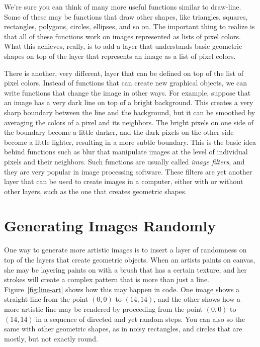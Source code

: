 We're sure you can think of many more useful functions similar to 
\textsf{draw-line}. Some of these may be functions that draw
other shapes, like triangles, squares, rectangles, polygons, circles, 
ellipses, and so on. The important thing to realize is that all of
these functions work on images represented as lists of pixel colors. 
What this achieves, really, is to add a layer that understands
basic geometric shapes on top of the layer that represents an image 
as a list of pixel colors.

There is another, very different, layer that can be defined
on top of the list of pixel colors. Instead of functions that can
create new graphical objects, we can write functions that change the
image in other ways. For example, suppose that an image has a
very dark line on top of a bright background. This creates a very 
sharp boundary between the line and the background, but it can be
smoothed by averaging the colors of a pixel and its neighbors. The
bright pixels on one side of the boundary become a little darker,
and the dark pixels on the other side become a little lighter, 
resulting in a more subtle boundary. This is the basic idea behind
functions such as \textsf{blur} that manipulate images at the level
of individual pixels and their neighbors. Such functions are usually
called \emph{image filters}, and they are very popular in image
processing software. These filters are yet another layer that can be 
used to create images in a computer, either with or without other
layers, such as the one that creates geometric shapes.

\section{Generating Images Randomly}

One way to generate more artistic images is to insert a layer of
randomness on top of the layers that create geometric objects. 
When an artists paints on canvas, she may be layering paints on
with a brush that has a certain texture, and her strokes will create
a complex pattern that is more than just a line.
Figure~\ref{fig:line-art} shows how this may happen in code. One
image shows a straight line from the point $(0,0)$ to $(14,14)$, 
and the other shows how a more artistic line may be rendered by 
proceeding from the point $(0,0)$ to $(14,14)$ in a sequence of
directed and yet random steps. You can also so the same with other
geometric shapes, as in noisy rectangles, and circles that are
mostly, but not exactly round.

